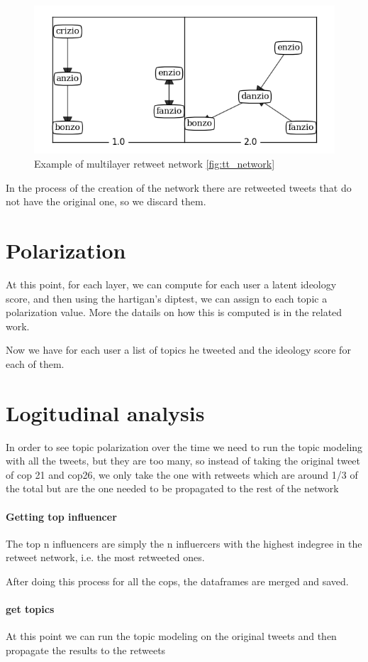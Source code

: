 \begin{figure}
    \centering
    \includegraphics[width=0.75\linewidth]{Chapter4/figures/projected_topics_ml.png}
    \caption{Example of multilayer retweet network \ref{fig:tt_network}}
    \label{fig:multilayer}
\end{figure}



In the process of the creation of the network there are retweeted tweets that do not have the original one, so we discard them.

\section{Polarization}
At this point, for each layer, we can compute for each user a latent ideology score, and then using the hartigan's diptest, we can assign to each topic a polarization value. More the datails on how this is computed is in the related work.

Now we have for each user a list of topics he tweeted and the ideology score for each of them.

\section{Logitudinal analysis}
In order to see topic polarization over the time we need to run the topic modeling with all the tweets, but they are too many, so instead of taking the original tweet of cop 21 and cop26, we only take the one with retweets which are around 1/3 of the total but are the one needed to be propagated to the rest of the network

\paragraph{Getting top influencer}
The top n influencers are simply the n influercers with the highest indegree in the retweet network, i.e. the most retweeted ones.


After doing this process for all the cops, the dataframes are merged and saved.

\paragraph{get topics}
At this point we can run the topic modeling on the original tweets and then propagate the results to the retweets 
